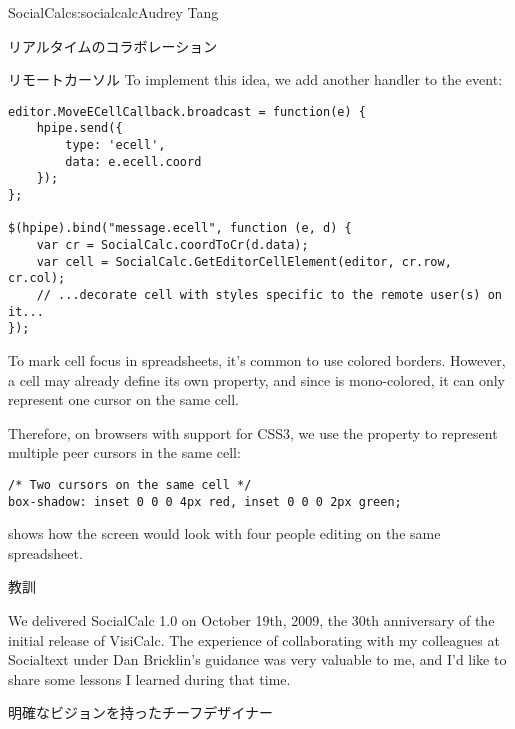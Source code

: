 \begin{aosachapter}{SocialCalc}{s:socialcalc}{Audrey Tang}
\begin{aosasect1}{リアルタイムのコラボレーション}
\begin{aosasect2}{リモートカーソル}
To implement this idea, we add another  handler to the
 event:

\begin{verbatim}
editor.MoveECellCallback.broadcast = function(e) {
    hpipe.send({
        type: 'ecell',
        data: e.ecell.coord
    });
};

$(hpipe).bind("message.ecell", function (e, d) {
    var cr = SocialCalc.coordToCr(d.data);
    var cell = SocialCalc.GetEditorCellElement(editor, cr.row, cr.col);
    // ...decorate cell with styles specific to the remote user(s) on it...
});
\end{verbatim}

To mark cell focus in spreadsheets, it's common to use colored
borders.  However, a cell may already define its own 
property, and since  is mono-colored, it can only
represent one cursor on the same cell.

Therefore, on browsers with support for CSS3, we use the 
property to represent multiple peer cursors in the same cell:

\begin{verbatim}
/* Two cursors on the same cell */
box-shadow: inset 0 0 0 4px red, inset 0 0 0 2px green;
\end{verbatim}

 shows how the screen would look with four
people editing on the same spreadsheet.


\end{aosasect2}

\end{aosasect1}

\begin{aosasect1}{教訓}

We delivered SocialCalc 1.0 on October 19th, 2009, the 30th
anniversary of the initial release of VisiCalc.  The experience of
collaborating with my colleagues at Socialtext under Dan Bricklin's
guidance was very valuable to me, and I'd like to share some lessons
I learned during that time.

\begin{aosasect2}{明確なビジョンを持ったチーフデザイナー}


\end{aosasect2}
\end{aosasect1}
\end{aosachapter}
